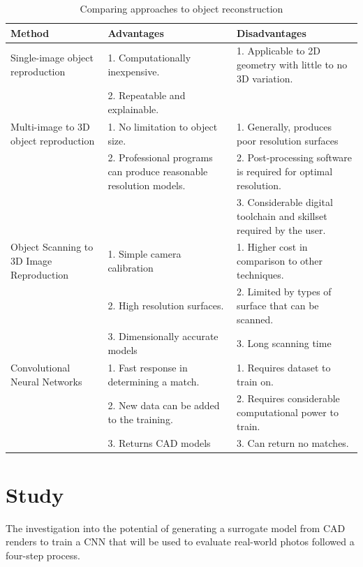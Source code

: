 \documentclass[a4paper, 11pt]{article}
\begin{document}
\begin{table}
  \caption{Comparing approaches to object reconstruction}
  \label{tbl:comparison}\footnotesize
  \begin{tabular}{L{0.3\textwidth} L{0.3\textwidth} L{0.3\textwidth}}
    \toprule
      Method & Advantages & Disadvantages \\
    \midrule
      Single-image object reproduction & 1. Computationally inexpensive. & 1. Applicable to 2D geometry with little to no 3D variation. \\
      & 2. Repeatable and explainable. & \\
      \midrule
  
      Multi-image to 3D object reproduction & 1. No limitation to object size. & 1. Generally, produces poor resolution surfaces \\
      & 2. Professional programs can produce reasonable resolution models. & 2. Post-processing software is required for optimal resolution. \\
      & & 3. Considerable digital toolchain and skillset required by the user. \\
  
      \midrule
      Object Scanning to 3D Image Reproduction & 1. Simple camera calibration & 1. Higher cost in comparison to other techniques. \\
      & 2. High resolution surfaces. & 2. Limited by types of surface that can be scanned. \\
      & 3. Dimensionally accurate models & 3. Long scanning time \\
  
      \midrule
      Convolutional Neural Networks & 1. Fast response in determining a match. & 1. Requires dataset to train on. \\
      & 2. New data can be added to the training. & 2. Requires considerable computational power to train. \\
      & 3. Returns CAD models & 3. Can return no matches. \\
    \bottomrule
  \end{tabular}
\end{table}



\section{Study}\label{sec:study}

The investigation into the potential of generating a surrogate model from CAD renders to train a CNN that will be used to evaluate real-world photos followed a four-step process.
\end{document}
